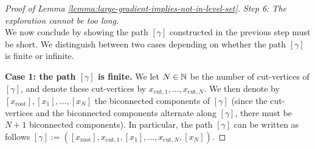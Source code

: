 \documentclass[12pt]{amsart}
\numberwithin{equation}{section}
\begin{document}
\begin{proof}[Proof of Lemma \ref{lemma:large-gradient-implies-not-in-level-set}]
		
		{\it Step 6: The exploration cannot be too long.} \\
		We now conclude by showing the path $[\gamma]$ constructed in the previous step must be short. We distinguish between two cases depending on whether the path $[\gamma]$ is finite or infinite. 
		
		\medskip
		
		\textbf{Case 1: the path $[\gamma]$ is finite.} We let $N \in \operatorname{\mathbb{N}}$ be the number of cut-vertices of $[\gamma]$, and denote these cut-vertices by $x_{\mathrm{cut} , 1}, \ldots , x_{\mathrm{cut} , N}$. We then denote by $[x_{\mathrm{root}}], [x_{1}], \ldots, [x_{N}]$ the biconnected components of $[\gamma]$ (since the cut-vertices and the biconnected components alternate along $[\gamma]$, there must be $N+1$ biconnected components). In particular, the path $[\gamma]$ can be written as follows $[\gamma] := ([x_{\mathrm{root}}], x_{\mathrm{cut}, 1}, [x_{1}], \ldots, x_{\mathrm{cut} , N}, [x_{N}])$.
		

\end{proof}
\end{document}
